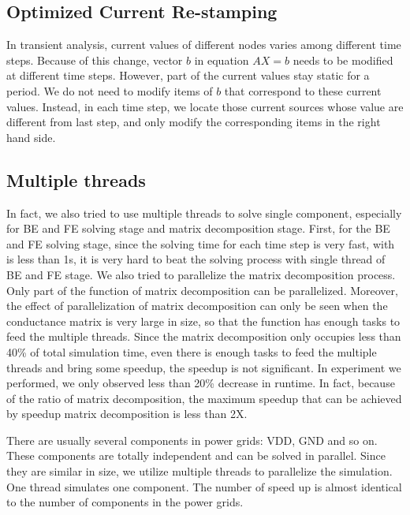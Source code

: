   \subsection{Optimized Current Re-stamping}
In transient analysis, current values of different nodes varies among different time steps. Because of this change, vector $b$ in equation $AX=b$ needs to be modified at different time steps. However, part of the current values stay static for a period. We do not need to modify
items of $b$ that correspond to these current values. Instead, in each time step, we locate those current sources whose value are
different from last step, and only modify the corresponding items in the right hand side. 

  \subsection{Multiple threads}
In fact, we also tried to use multiple threads to solve single component, especially for BE and FE solving stage and matrix decomposition stage. First, for the BE and FE solving stage, since the solving time for each time step is very fast, with is less than 1s, it is very hard 
to beat the solving process with single thread of BE and FE stage. We also tried to parallelize the matrix decomposition process. Only part of the function of matrix decomposition can be parallelized. Moreover, the effect of parallelization of matrix decomposition can only be seen when the conductance matrix is very large in size, so that the function has enough tasks to feed the multiple threads. Since the matrix decomposition only occupies less than 40\% of total simulation time, even there is enough tasks to feed the multiple threads and bring some speedup, the speedup is not significant. In experiment we performed, we only observed less than 20\% decrease in runtime. In fact, because of the ratio of matrix decomposition, the maximum speedup that can be achieved by speedup matrix decomposition is less than 2X.

There are usually several components in power grids: VDD, GND and so on. These components are totally independent and can be solved
in parallel. Since they are similar in size, we utilize multiple threads to parallelize the simulation. One thread simulates one component. The number of speed up is almost identical to the number of components in the power grids.